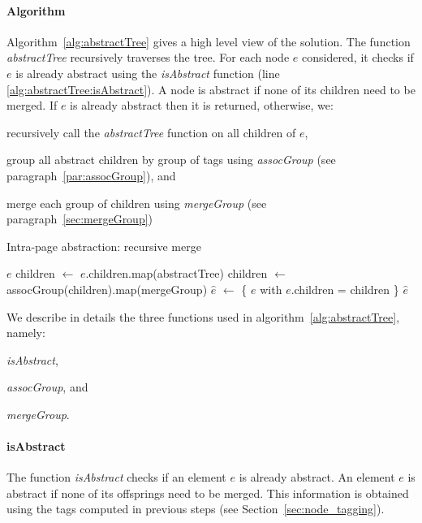 \paragraph{Algorithm}
Algorithm~\ref{alg:abstractTree} gives a high level view of the solution.
The function \emph{abstractTree} recursively traverses the tree.
For each node $e$ considered, it checks if $e$ is already abstract using the \emph{isAbstract} function (line \ref{alg:abstractTree:isAbstract}).
A node is abstract if none of its children need to be merged.
If $e$ is already abstract then it is returned, otherwise, we:
\begin{compactenum}
  \item recursively call the \emph{abstractTree} function on all children of $e$,
  \item group all abstract children by group of tags using \emph{assocGroup} (see paragraph~\ref{par:assocGroup}), and
  \item merge each group of children using \emph{mergeGroup} (see paragraph~\ref{sec:mergeGroup})
\end{compactenum}

\begin{algorithm}
\caption{Intra-page abstraction: recursive merge}\label{alg:abstractTree}
\begin{algorithmic}[1]
      \label{alg:abstractTree:isAbstract}
      \State \Return $e$
    \Else
      \State children $\gets$ $e$.children.map(abstractTree)
      \State children $\gets$ assocGroup(children).map(mergeGroup)
      \State $\hat{e}$ $\gets$ \{ $e$ with $e$.children = children \}
      \State \Return $\hat{e}$
    \EndIf
  \EndFunction
\end{algorithmic}
\end{algorithm}

We describe in details the three functions used in algorithm~\ref{alg:abstractTree}, namely:
\begin{inparaenum}
  \item \emph{isAbstract},
  \item \emph{assocGroup}, and
  \item \emph{mergeGroup}.
\end{inparaenum}

\paragraph{isAbstract}
The function \emph{isAbstract} checks if an element $e$ is already abstract.
An element $e$ is abstract if none of its offsprings need to be merged.
This information is obtained using the tags computed in previous steps (see Section~\ref{sec:node_tagging}).

